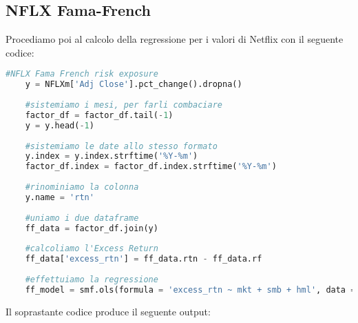 \documentclass{report}
\begin{document}
\subsection{NFLX Fama-French}
Procediamo poi al calcolo della regressione per i valori di Netflix con il seguente codice:

\begin{lstlisting}[language=python]
    #NFLX Fama French risk exposure
    y = NFLXm['Adj Close'].pct_change().dropna()
    
    #sistemiamo i mesi, per farli combaciare
    factor_df = factor_df.tail(-1)
    y = y.head(-1)
    
    #sistemiamo le date allo stesso formato
    y.index = y.index.strftime('%Y-%m')
    factor_df.index = factor_df.index.strftime('%Y-%m')
    
    #rinominiamo la colonna
    y.name = 'rtn'
    
    #uniamo i due dataframe
    ff_data = factor_df.join(y)
    
    #calcoliamo l'Excess Return
    ff_data['excess_rtn'] = ff_data.rtn - ff_data.rf
    
    #effettuiamo la regressione
    ff_model = smf.ols(formula = 'excess_rtn ~ mkt + smb + hml', data = ff_data).fit()
\end{lstlisting}
Il soprastante codice produce il seguente output:
\end{document}
